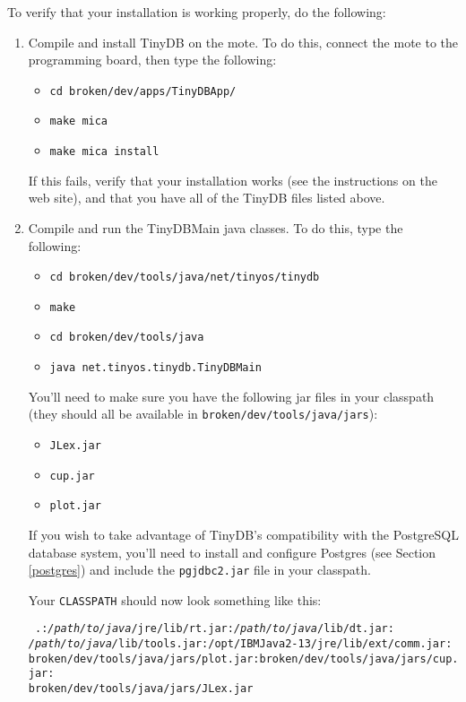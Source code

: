 \documentclass[11pt]{article}
\newcommand{\docroot}{broken/dev}
\newcommand{\java}{broken/dev/tools/java}
\begin{document}
\noindent To verify that your installation is working properly, do the following:

\begin{enumerate}
\item Compile and install TinyDB on the mote.  To do this, connect the mote to
the programming board, then type the following:
\begin{itemize}
\item {\tt cd \docroot/apps/TinyDBApp/}
\item {\tt make mica}
\item {\tt make mica install}
\end{itemize}
If this fails, verify that your installation works (see the instructions on the web
site), and that you have all of the TinyDB files listed above.

\item Compile and run the TinyDBMain java classes.  To do this, type the following:
\begin{itemize}
\item {\tt cd {\java}/net/tinyos/tinydb}
\item {\tt make}
\item {\tt cd {\java}}
\item {\tt java net.tinyos.tinydb.TinyDBMain}
\end{itemize}

You'll need to make sure you have the following jar files in your classpath (they should all be available in {\tt {\java}/jars}):
\begin{itemize}
\item {\tt JLex.jar}
\item {\tt cup.jar}
\item {\tt plot.jar}
\end{itemize}

If you wish to take advantage of TinyDB's compatibility with the PostgreSQL 
database system, you'll need 
to install and configure Postgres (see Section \ref{postgres}) 
 and include the {\tt pgjdbc2.jar} file in your classpath.

Your {\tt CLASSPATH} should now look something like this:

{\tt
.:{\it /path/to/java}/jre/lib/rt.jar:{\it /path/to/java}/lib/dt.jar:\\
{\it /path/to/java/}lib/tools.jar:/opt/IBMJava2-13/jre/lib/ext/comm.jar:\\
{\java}/jars/plot.jar:{\java}/jars/cup.jar:\\
{\java}/jars/JLex.jar
}

\end{enumerate}
\end{document}

